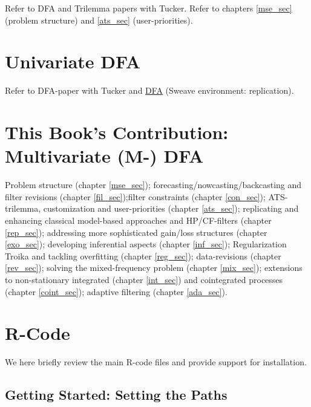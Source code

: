 \documentclass[a4paper]{book}
\begin{document}
Refer to DFA and Trilemma papers with Tucker. Refer to chapters \ref{mse_sec} (problem structure) and \ref{ats_sec} (user-priorities). 

\section{Univariate DFA}

Refer to DFA-paper with Tucker and \href{http://blog.zhaw.ch/sef/files/2014/10/DFA.pdf}{DFA} (Sweave environment: replication). 


\section{This Book's Contribution: Multivariate (M-) DFA}

Problem structure (chapter \ref{mse_sec}); forecasting/nowcasting/backcasting and filter revisions (chapter \ref{fil_sec});filter constraints (chapter \ref{con_sec}); ATS-trilemma, customization and user-priorities (chapter \ref{ats_sec}); replicating and enhancing classical model-based approaches and HP/CF-filters (chapter \ref{rep_sec}); addressing more sophisticated gain/loss structures (chapter \ref{exo_sec}); developing inferential aspects (chapter \ref{inf_sec}); Regularization Troika and tackling overfitting (chapter \ref{reg_sec}); data-revisions (chapter \ref{rev_sec}); solving the mixed-frequency problem (chapter \ref{mix_sec}); extensions to non-stationary integrated (chapter \ref{int_sec}) and cointegrated processes (chapter \ref{coint_sec}); adaptive filtering (chapter \ref{ada_sec}).




\section{R-Code}

We here briefly review the main R-code files and provide support for installation.

\subsection{Getting Started: Setting the Paths}
\end{document}

